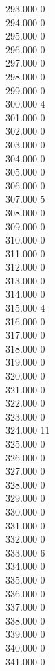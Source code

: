 { 293.000	0 \\
 294.000	0 \\
 295.000	0 \\
 296.000	0 \\
 297.000	0 \\
 298.000	0 \\
 299.000	0 \\
 300.000	4 \\
 301.000	0 \\
 302.000	0 \\
 303.000	0 \\
 304.000	0 \\
 305.000	0 \\
 306.000	0 \\
 307.000	5 \\
 308.000	0 \\
 309.000	0 \\
 310.000	0 \\
 311.000	0 \\
 312.000	0 \\
 313.000	0 \\
 314.000	0 \\
 315.000	4 \\
 316.000	0 \\
 317.000	0 \\
 318.000	0 \\
 319.000	0 \\
 320.000	0 \\
 321.000	0 \\
 322.000	0 \\
 323.000	0 \\
 324.000	11 \\
 325.000	0 \\
 326.000	0 \\
 327.000	0 \\
 328.000	0 \\
 329.000	0 \\
 330.000	0 \\
 331.000	0 \\
 332.000	0 \\
 333.000	6 \\
 334.000	0 \\
 335.000	0 \\
 336.000	0 \\
 337.000	0 \\
 338.000	0 \\
 339.000	0 \\
 340.000	0 \\
 341.000	0 \\
}
